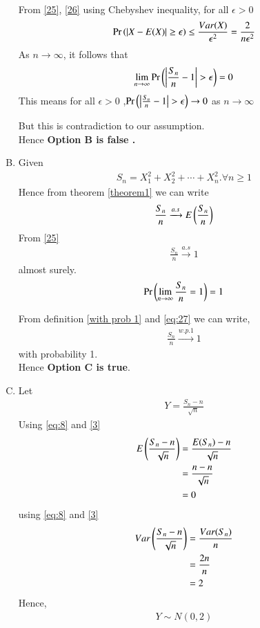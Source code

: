 \documentclass[journal,12pt,twocolumn]{IEEEtran}
\begin{document}
\begin{enumerate}[(A)]
\begin{align}
\end{align}
From \eqref{25}, \eqref{26} using Chebyshev inequality, for all $\epsilon > 0$
\begin{align}
   \Pr\left(|X-E(X)| \geq \epsilon\right) \leq \frac{Var(X)}{\epsilon^2}=\frac{2}{n \epsilon^2} \\
\end{align}
As $n \to \infty$, it follows that
\begin{align}
    \lim_{n \to \infty} \pr{\left|{\frac{S_n}{n}-1}\right|>\epsilon}=0
\end{align}
This means for all $\epsilon>0$ ,$\pr{\left|{\frac{S_n}{n}-1}\right|>\epsilon}\to 0$ as $n \to \infty$

But this is contradiction to our assumption.\\
Hence \textbf{Option B is false .}
 
 
 
 \item Given 
\begin{align}
    S_{n}=X_{1}^2+X_{2}^2+\cdots+X_{n}^2.\forall n\geq 1
\end{align}
Hence from theorem \ref{theorem1} we can write 
\begin{align}
    \frac{S_n}{n} \xrightarrow{a.s} E\left(\frac{S_n}{n}\right)
\end{align}
From \eqref{25}
\begin{align}
     \frac{S_n}{n} \xrightarrow{a.s} 1
\end{align}
almost surely.
\begin{align}
    \Pr\left(\lim_{n\to \infty}\frac{S_n}{n}=1\right)=1\label{eq:27}
\end{align}


From definition \ref{with prob 1} and \eqref{eq:27} we can write,
\begin{align}
    \frac{S_{n}}{n} \xrightarrow{w.p.1} 1
\end{align}
with probability 1.\\
Hence \textbf{Option C is true}.



\item
Let 
\begin{align}
    Y=\frac{S_{n}-n}{\sqrt{n}}
\end{align}
Using \eqref{eq:8} and \eqref{3}
\begin{align}
    E\left(\frac{S_{n}-n}{\sqrt{n}}\right)&=\frac{E(S_n)-n}{\sqrt{n}}\\
    &=\frac{n-n}{\sqrt{n}}\\
    &=0
\end{align}
using \eqref{eq:8} and \eqref{3}
\begin{align}
     Var\left(\frac{S_{n}-n}{\sqrt{n}}\right)&=\frac{Var(S_n)}{n}\\
     &=\frac{2n}{n}\\
     &=2
\end{align}
Hence,
\begin{align}
    Y \sim N(0,2)\label{eq:D}
\end{align}


\end{enumerate}
\end{document}

